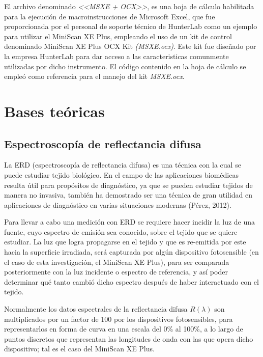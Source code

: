 			El archivo denominado \textit{<<MSXE + OCX>>}, es una hoja de c\'{a}lculo habilitada para la ejecuci\'{o}n de macroinstrucciones de Microsoft Excel, que fue proporcionada por el personal de soporte t\'{e}cnico de HunterLab como un ejemplo para utilizar el MiniScan XE Plus, empleando el uso de un kit de control denominado MiniScan XE Plus OCX Kit \textit{(MSXE.ocx)}. Este kit fue dise\~{n}ado por la empresa HunterLab para dar acceso a las caracteristicas comunmente utilizadas por dicho instrumento. El c\'{o}digo contenido en la hoja de c\'{a}lculo se emple\'{o} como referencia para el manejo del kit \textit{MSXE.ocx}.

	\section{Bases te\'{o}ricas}
	
	\subsection{Espectroscop\'{i}a de reflectancia difusa}
	
		La ERD (espectroscop\'{i}a de reflectancia difusa) es una t\'{e}cnica con la cual se puede estudiar tejido biol\'{o}gico. En el campo de las aplicaciones biom\'{e}dicas resulta \'{u}til para prop\'{o}sitos de diagn\'{o}stico, ya que se pueden estudiar tejidos de manera no invasiva, tambi\'{e}n ha demostrado ser una t\'{e}cnica de gran utilidad en aplicaciones de diagn\'{o}stico en varias situaciones modernas (P\'{e}rez, 2012).
		
		Para llevar a cabo una medici\'{o}n con ERD se requiere hacer incidir la luz de una fuente, cuyo espectro de emisi\'{o}n sea conocido, sobre el tejido que se quiere estudiar. La luz que logra propagarse en el tejido y que es re-emitida por este hacia la superficie irradiada, ser\'{a} capturada por alg\'{u}n dispositivo fotosensible (en el caso de esta investigaci\'{o}n, el MiniScan XE Plus), para ser comparada posteriormente con la luz incidente o espectro de referencia, y as\'{i} poder determinar qu\'{e} tanto cambi\'{o} dicho espectro despu\'{e}s de haber interactuado con el tejido.
		
		Normalmente los datos espectrales de la reflectancia difusa $R(\lambda)$ son multiplicados por un factor de 100 por los dispositivos fotosensibles, para representarlos en forma de curva en una escala del 0\% al 100\%, a lo largo de puntos discretos que representan las longitudes de onda con las que opera dicho dispositivo; tal es el caso del MiniScan XE Plus.
	
